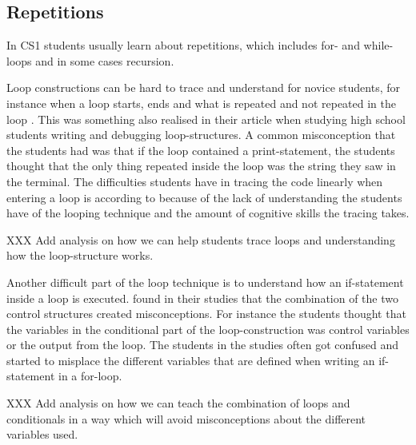 \subsection{Repetitions}

In CS1 students usually learn about repetitions, which includes for- and while-loops and in some cases recursion.

Loop constructions can be hard to trace and understand for novice students, for instance when a loop starts, ends and what is repeated and not repeated in the loop \parencite{Sekiya2013,KumarVeerasamy2016,Kaczmarczyk2010}. This was something \textcite{Sleeman1984} also realised in their article when studying high school students writing and debugging loop-structures. A common misconception that the students had was that if the loop contained a print-statement, the students thought that the only thing  repeated inside the loop was the string they saw in the terminal. The difficulties students have in tracing the code linearly when entering a loop is according to \textcite{KumarVeerasamy2016} because of the lack of understanding the students have of the looping technique and the amount of cognitive skills the tracing takes.

XXX Add analysis on how we can help students trace loops and understanding how the loop-structure works.

Another difficult part of the loop technique is to understand how an if-statement inside a loop is executed. \textcite{Sekiya2013} found in their studies that the combination of the two control structures created misconceptions. For instance the students thought that the variables in the conditional part of the loop-construction was control variables or the output from the loop. The students in the studies often got confused and started to misplace the different variables that are defined when writing an if-statement in a for-loop.

XXX Add analysis on how we can teach the combination of loops and conditionals in a way which will avoid misconceptions about the different variables used. 

